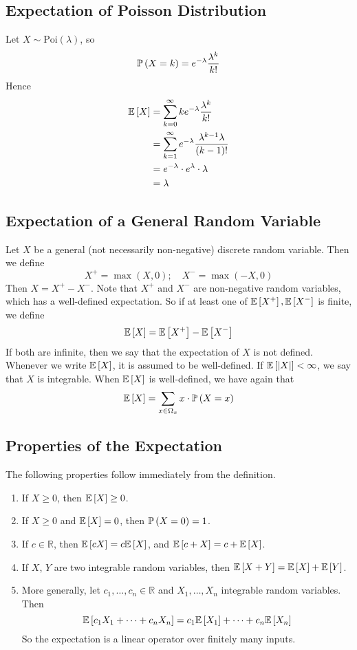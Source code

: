 \subsection{Expectation of Poisson Distribution}
Let \(X \sim \text{Poi}(\lambda)\), so
\[
	\mathbb{P}\left({X = k}\right) = e^{-\lambda} \frac{\lambda^k}{k!}
\]
Hence
\begin{align*}
	\mathbb{E}\left[{X}\right] & = \sum_{k=0}^\infty k e^{-\lambda} \frac{\lambda^k}{k!}              \\
	           & =\sum_{k=1}^\infty e^{-\lambda} \frac{\lambda^{k-1} \lambda}{(k-1)!} \\
	           & = e^{-\lambda} \cdot e^{\lambda} \cdot \lambda                       \\
	           & = \lambda
\end{align*}

\subsection{Expectation of a General Random Variable}
Let \(X\) be a general (not necessarily non-negative) discrete random variable.
Then we define
\[
	X^+ = \max(X, 0);\quad X^- = \max(-X, 0)
\]
Then \(X = X^+ - X^-\).
Note that \(X^+\) and \(X^-\) are non-negative random variables, which has a well-defined expectation.
So if at least one of \(\mathbb{E}\left[{X^+}\right], \mathbb{E}\left[{X^-}\right]\) is finite, we define
\[
	\mathbb{E}\left[{X}\right] = \mathbb{E}\left[{X^+}\right] - \mathbb{E}\left[{X^-}\right]
\]
If both are infinite, then we say that the expectation of \(X\) is not defined.
Whenever we write \(\mathbb{E}\left[{X}\right]\), it is assumed to be well-defined.
If \(\mathbb{E}\left[{\abs{X}}\right] < \infty\), we say that \(X\) is integrable.
When \(\mathbb{E}\left[{X}\right]\) is well-defined, we have again that
\[
	\mathbb{E}\left[{X}\right] = \sum_{x \in \Omega_x} x \cdot \mathbb{P}\left({X = x}\right)
\]

\subsection{Properties of the Expectation}
The following properties follow immediately from the definition.
\begin{enumerate}
	\item If \(X \geq 0\), then \(\mathbb{E}\left[{X}\right] \geq 0\).
	\item If \(X \geq 0\) and \(\mathbb{E}\left[{X}\right] = 0\), then \(\mathbb{P}\left({X = 0}\right) = 1\).
	\item If \(c \in \mathbb R\), then \(\mathbb{E}\left[{cX}\right] = c\mathbb{E}\left[{X}\right]\), and \(\mathbb{E}\left[{c + X}\right] = c + \mathbb{E}\left[{X}\right]\).
	\item If \(X\), \(Y\) are two integrable random variables, then \(\mathbb{E}\left[{X + Y}\right] = \mathbb{E}\left[{X}\right] + \mathbb{E}\left[{Y}\right]\).
	\item More generally, let \(c_1, \dots, c_n \in \mathbb R\) and \(X_1, \dots, X_n\) integrable random variables.
	      Then
	      \[
		      \mathbb{E}\left[{c_1X_1 + \dots + c_n X_n}\right] = c_1 \mathbb{E}\left[{X_1}\right] + \dots + c_n \mathbb{E}\left[{X_n}\right]
	      \]
	      So the expectation is a linear operator over finitely many inputs.
\end{enumerate}
